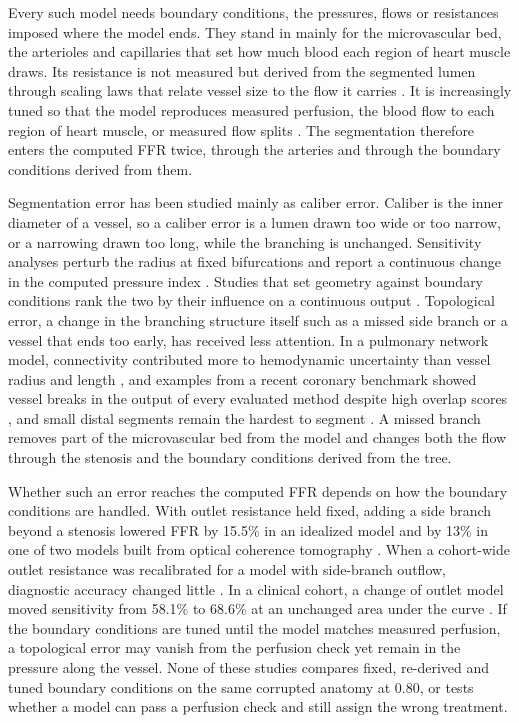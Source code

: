 \documentclass[journal]{IEEEtran}
\begin{document}
Every such model needs boundary conditions, the pressures, flows or resistances imposed where the model ends. They
stand in mainly for the microvascular bed, the arterioles and capillaries that set how much blood each region of heart
muscle draws. Its resistance is not measured but derived from the segmented lumen through
scaling laws that relate vessel size to the flow it carries \cite{murray1926,kim2010}. It is increasingly tuned so that the model reproduces measured perfusion, the blood flow to each region of heart
muscle, or measured flow splits \cite{menon2024,arminio2026}. The segmentation therefore enters the computed FFR twice, through the arteries and through the boundary conditions derived from them.

Segmentation error has been studied mainly as caliber error. Caliber is the inner diameter of a vessel, so a caliber error is a lumen drawn too wide or too narrow, or a narrowing drawn too long, while the branching is unchanged. Sensitivity analyses perturb the radius at fixed bifurcations and report a continuous change in the computed pressure index \cite{sankaran2015tmi,sankaran2015cmame,fernandez2024,dalmaso2025}. Studies that set geometry against
boundary conditions rank the two by their influence on a continuous output \cite{sankaran2016,tanade2022,korte2023}. Topological error, a change in the branching structure itself such as a missed side branch or a vessel that ends too early, has received less attention. In a pulmonary network model, connectivity contributed more to hemodynamic uncertainty than vessel radius and
length \cite{colebank2019}, and examples from a recent coronary benchmark showed vessel breaks in the output of every evaluated method despite high overlap scores \cite{bransby2026}, and small distal segments remain the hardest to segment
\cite{chen2025}. A missed branch removes part of the microvascular bed from the model and changes both the flow
through the stenosis and the boundary conditions derived from the tree.

Whether such an error reaches the computed FFR depends on how the boundary conditions are handled. With outlet resistance held fixed, adding a side branch beyond a stenosis lowered FFR by 15.5\% in an idealized model and by 13\% in one of two models built from optical coherence tomography \cite{gamage2022}. When a cohort-wide outlet resistance was recalibrated for a model with side-branch outflow, diagnostic accuracy changed little \cite{gosling2020}. In a clinical cohort, a change of outlet model moved sensitivity from 58.1\% to 68.6\% at an unchanged area under
the curve \cite{fossan2026}. If the boundary conditions are tuned until the model matches measured perfusion, a topological error may vanish
from the perfusion check yet remain in the pressure along the vessel. None of these studies compares fixed, re-derived and tuned boundary conditions on the same corrupted anatomy at
0.80, or tests whether a model can pass a perfusion check and still assign the wrong treatment.
\end{document}
